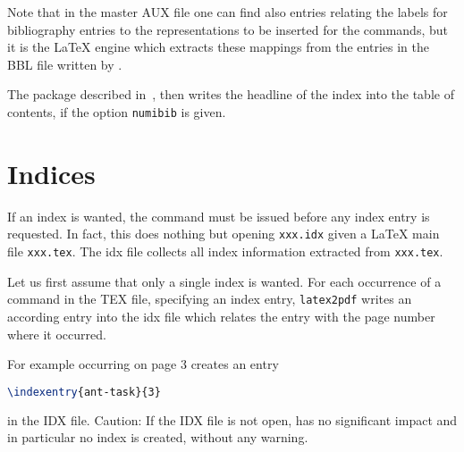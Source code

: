 Note that in the master AUX file one can find also entries  
relating the labels for bibliography entries to the representations 
to be inserted for the  commands, 
but it is the \LaTeX{} engine which extracts these mappings 
from the  entries in the BBL file written by . 

The package  described in~\cite{TocBibIndP}, 
then writes the headline of the index into the table of contents, 
if the option \texttt{numibib} is given.



\section{Indices}\label{sec:indices}

If an index is wanted, the command  must be issued
before any index entry is requested. 
In fact, this does nothing but opening \texttt{xxx.idx} 
given a \LaTeX{} main file \texttt{xxx.tex}. 
The \gls{idx} file collects all index information extracted from \texttt{xxx.tex}. 




Let us first assume that only a single index is wanted. 
For each occurrence 
of a command  in the TEX file, 
specifying an index entry,
\texttt{latex2pdf} writes an according entry  
into the \gls{idx} file 
which relates the entry with the page number where it occurred. 

For example  occurring on page 3 creates an entry 
%
\begin{lstlisting}[language=TeX]
\indexentry{ant-task}{3}
\end{lstlisting}
%
in the IDX file. 
Caution: If the IDX file is not open, 
 has no significant impact and in particular no index is created, 
without any warning. 

